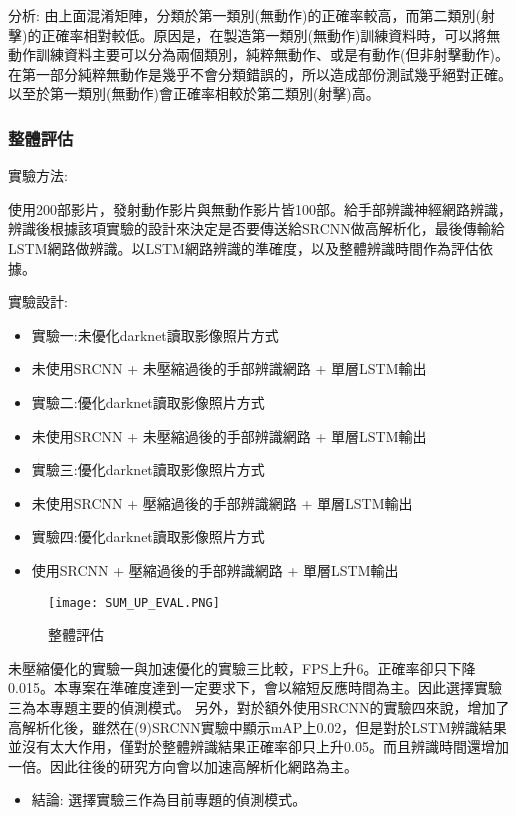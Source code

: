 分析:
由上面混淆矩陣，分類於第一類別(無動作)的正確率較高，而第二類別(射擊)的正確率相對較低。原因是，在製造第一類別(無動作)訓練資料時，可以將無動作訓練資料主要可以分為兩個類別，純粹無動作、或是有動作(但非射擊動作)。在第一部分純粹無動作是幾乎不會分類錯誤的，所以造成部份測試幾乎絕對正確。以至於第一類別(無動作)會正確率相較於第二類別(射擊)高。


\subsubsection{整體評估}
實驗方法:

使用200部影片，發射動作影片與無動作影片皆100部。給手部辨識神經網路辨識，辨識後根據該項實驗的設計來決定是否要傳送給SRCNN做高解析化，最後傳輸給LSTM網路做辨識。以LSTM網路辨識的準確度，以及整體辨識時間作為評估依據。

實驗設計:
\begin{itemize}
\item 實驗一:未優化darknet讀取影像照片方式
\item 未使用SRCNN + 未壓縮過後的手部辨識網路 + 單層LSTM輸出
\item 實驗二:優化darknet讀取影像照片方式
\item 未使用SRCNN + 未壓縮過後的手部辨識網路 + 單層LSTM輸出
\item 實驗三:優化darknet讀取影像照片方式
\item 未使用SRCNN + 壓縮過後的手部辨識網路 + 單層LSTM輸出
\item 實驗四:優化darknet讀取影像照片方式
\item 使用SRCNN + 壓縮過後的手部辨識網路 + 單層LSTM輸出
\end{itemize}

\begin{figure}[H]
    \centering
    \texttt{[image: SUM\_UP\_EVAL.PNG]}
    \caption{整體評估}
    \label{fig:整體評估}
\end{figure}


未壓縮優化的實驗一與加速優化的實驗三比較，FPS上升6。正確率卻只下降0.015。本專案在準確度達到一定要求下，會以縮短反應時間為主。因此選擇實驗三為本專題主要的偵測模式。
另外，對於額外使用SRCNN的實驗四來說，增加了高解析化後，雖然在(9)SRCNN實驗中顯示mAP上0.02，但是對於LSTM辨識結果並沒有太大作用，僅對於整體辨識結果正確率卻只上升0.05。而且辨識時間還增加一倍。因此往後的研究方向會以加速高解析化網路為主。

\begin{itemize}
\item 結論: 選擇實驗三作為目前專題的偵測模式。
\end{itemize}
